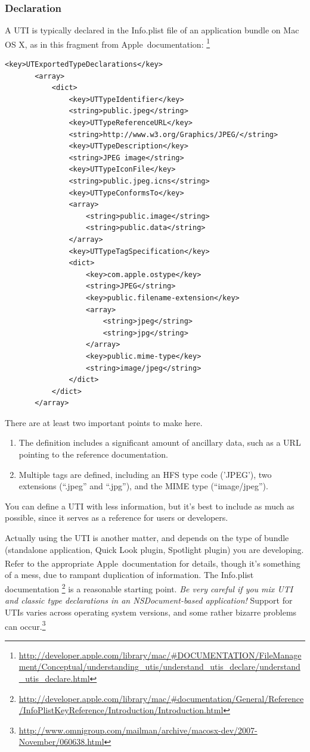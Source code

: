 \documentclass[11pt]{article}
\providecommand{\xspace}{~}
\newcommand*{\apple}{Apple\textsuperscript{\textregistered}\xspace}
\begin{document}
\subsubsection{Declaration}
A UTI is typically declared in the Info.plist file of an application
bundle on Mac OS X, as in this fragment from \apple documentation:%
\footnote{\url{http://developer.apple.com/library/mac/\#DOCUMENTATION/FileManagement/Conceptual/understanding_utis/understand_utis_declare/understand_utis_declare.html}} 
\lstset{language=plist}
\begin{lstlisting}
<key>UTExportedTypeDeclarations</key>
       <array>
           <dict>
               <key>UTTypeIdentifier</key>
               <string>public.jpeg</string>
               <key>UTTypeReferenceURL</key>
               <string>http://www.w3.org/Graphics/JPEG/</string>
               <key>UTTypeDescription</key>
               <string>JPEG image</string>
               <key>UTTypeIconFile</key>
               <string>public.jpeg.icns</string>
               <key>UTTypeConformsTo</key>
               <array>
                   <string>public.image</string>
                   <string>public.data</string>
               </array>
               <key>UTTypeTagSpecification</key>
               <dict>
                   <key>com.apple.ostype</key>
                   <string>JPEG</string>
                   <key>public.filename-extension</key>
                   <array>
                       <string>jpeg</string>
                       <string>jpg</string>
                   </array>
                   <key>public.mime-type</key>
                   <string>image/jpeg</string>
               </dict>
           </dict>
       </array>
\end{lstlisting}
There are at least two important points to make here.
\begin{enumerate}
    \item
    The definition includes a significant amount of ancillary data, such as
    a URL pointing to the reference documentation.
    \item
    Multiple tags are defined, including an HFS type code ('JPEG'), two
    extensions (“.jpeg” and “.jpg”), and the MIME type (“image/jpeg”).
\end{enumerate}
You can define a UTI with less information, but it's best to include
as much as possible, since it serves as a reference for users or developers.

Actually using the UTI is another matter, and depends on the type of bundle
(standalone application, Quick Look plugin, Spotlight plugin) you are developing.
Refer to the appropriate \apple documentation for details, though it's something
of a mess, due to rampant duplication of information. The Info.plist documentation%
\footnote{\url{http://developer.apple.com/library/mac/\#documentation/General/Reference/InfoPlistKeyReference/Introduction/Introduction.html}} is a reasonable starting point. \emph{Be very careful if you
mix UTI and classic type declarations in an NSDocument-based application!}
Support for UTIs varies across operating system versions, and some rather
bizarre problems can occur.\footnote{\url{http://www.omnigroup.com/mailman/archive/macosx-dev/2007-November/060638.html}}
\end{document}
